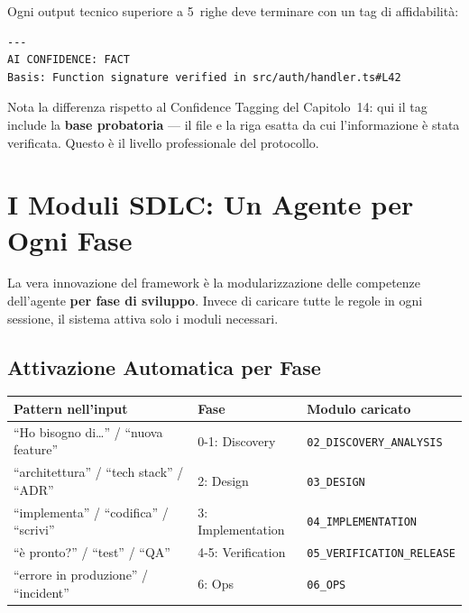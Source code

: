 Ogni output tecnico superiore a 5~righe deve terminare con un tag di affidabilità:

\begin{lstlisting}[language={}]
---
AI CONFIDENCE: FACT
Basis: Function signature verified in src/auth/handler.ts#L42
\end{lstlisting}

\begin{notebox}
Nota la differenza rispetto al Confidence Tagging del Capitolo~14: qui il tag include la \textbf{base probatoria} --- il file e la riga esatta da cui l'informazione è stata verificata. Questo è il livello professionale del protocollo.
\end{notebox}

\section{I Moduli SDLC: Un Agente per Ogni Fase}

La vera innovazione del framework è la modularizzazione delle competenze dell'agente \textbf{per fase di sviluppo}. Invece di caricare tutte le regole in ogni sessione, il sistema attiva solo i moduli necessari.

\subsection{Attivazione Automatica per Fase}

\begin{center}
\begin{small}
\begin{tabularx}{\textwidth}{X l X}
\toprule
\textbf{Pattern nell'input} & \textbf{Fase} & \textbf{Modulo caricato} \\
\midrule
``Ho bisogno di\ldots'' / ``nuova feature'' & 0-1: Discovery & \texttt{02\_DISCOVERY\_ANALYSIS} \\
``architettura'' / ``tech stack'' / ``ADR'' & 2: Design & \texttt{03\_DESIGN} \\
``implementa'' / ``codifica'' / ``scrivi'' & 3: Implementation & \texttt{04\_IMPLEMENTATION} \\
``è pronto?'' / ``test'' / ``QA'' & 4-5: Verification & \texttt{05\_VERIFICATION\_RELEASE} \\
``errore in produzione'' / ``incident'' & 6: Ops & \texttt{06\_OPS} \\
\bottomrule
\end{tabularx}
\end{small}
\end{center}

